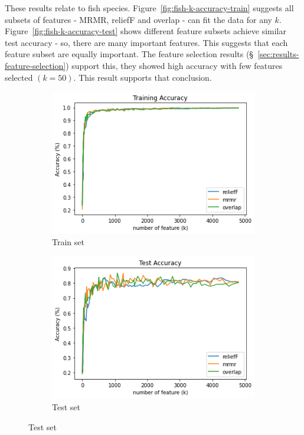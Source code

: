 \documentclass[runningheads]{llncs}
\begin{document}
These results relate to fish species.
Figure~\ref{fig:fish-k-accuracy-train} suggests all subsets of features - MRMR, reliefF and overlap - can fit the data for any $k$.
Figure~\ref{fig:fish-k-accuracy-test} shows different feature subsets achieve similar test accuracy - so, there are many important features.
This suggests that each feature subset are equally important.
The feature selection results (\S~\ref{sec:results-feature-selection}) support this, they showed high accuracy with few features selected $(k = 50)$.
This result supports that conclusion.

\begin{figure}[htb]
  \centering
  \begin{subfigure}[b]{\linewidth}
    \includegraphics[width=1\linewidth]{part_k_accuracy_train.png}
    \caption{Train set}
    \label{fig:part-k-accuracy-train}
  \end{subfigure}

  \begin{subfigure}[b]{\linewidth}
    \includegraphics[width=1\linewidth]{part_k_accuracy_test.png}
    \caption{Test set}
    \label{fig:part-k-accuracy-test}
  \end{subfigure}


\end{figure}
\end{document}
